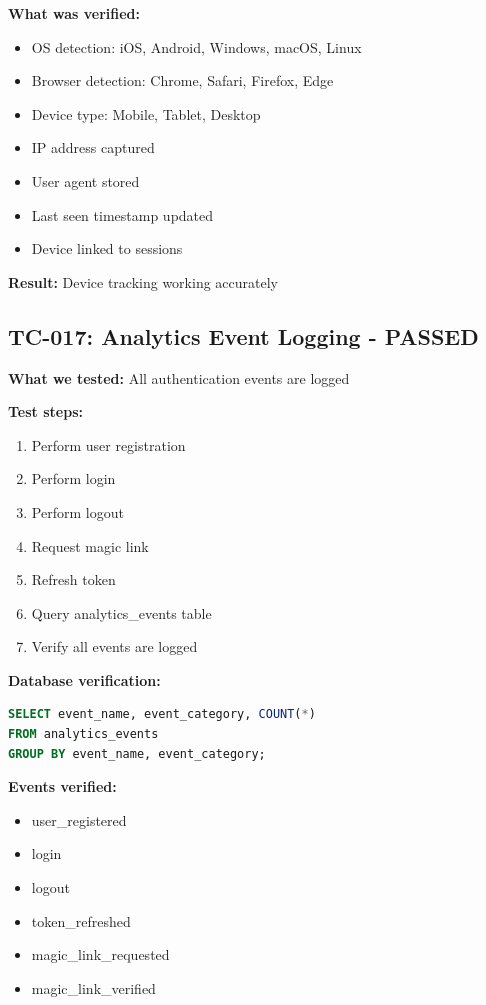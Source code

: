 \documentclass[11pt,a4paper]{article}
\begin{document}
\textbf{What was verified:}
\begin{itemize}
    \item OS detection: iOS, Android, Windows, macOS, Linux
    \item Browser detection: Chrome, Safari, Firefox, Edge
    \item Device type: Mobile, Tablet, Desktop
    \item IP address captured
    \item User agent stored
    \item Last seen timestamp updated
    \item Device linked to sessions
\end{itemize}

\textbf{Result:} Device tracking working accurately

\subsection{TC-017: Analytics Event Logging - PASSED}
\textbf{What we tested:} All authentication events are logged

\textbf{Test steps:}
\begin{enumerate}
    \item Perform user registration
    \item Perform login
    \item Perform logout
    \item Request magic link
    \item Refresh token
    \item Query analytics\_events table
    \item Verify all events are logged
\end{enumerate}

\textbf{Database verification:}
\begin{lstlisting}[language=sql]
SELECT event_name, event_category, COUNT(*) 
FROM analytics_events 
GROUP BY event_name, event_category;
\end{lstlisting}

\textbf{Events verified:}
\begin{itemize}
    \item user\_registered
    \item login
    \item logout
    \item token\_refreshed
    \item magic\_link\_requested
    \item magic\_link\_verified
\end{itemize}
\end{document}
